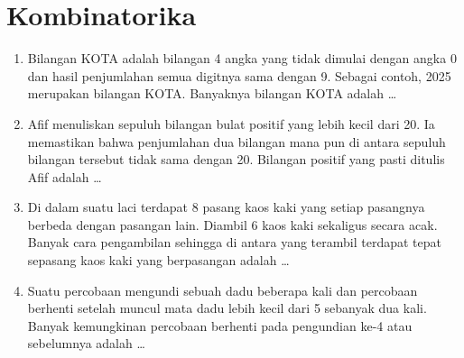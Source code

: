 \documentclass[12pt]{scrartcl}
\begin{document}
\section{Kombinatorika}
\begin{enumerate}[resume]
	\item Bilangan KOTA adalah bilangan 4 angka yang tidak dimulai dengan angka 0 dan hasil
	penjumlahan semua digitnya sama dengan 9. Sebagai contoh, 2025 merupakan bilangan KOTA.
	Banyaknya bilangan KOTA adalah \dots

	\item Afif menuliskan sepuluh bilangan bulat positif yang lebih kecil dari 20.
	Ia memastikan bahwa penjumlahan dua bilangan mana pun di antara sepuluh bilangan tersebut
	tidak sama dengan 20. Bilangan positif yang pasti ditulis Afif adalah \dots

	\item Di dalam suatu laci terdapat 8 pasang kaos kaki yang setiap pasangnya berbeda dengan
	pasangan lain. Diambil 6 kaos kaki sekaligus secara acak. Banyak cara pengambilan sehingga
	di antara yang terambil terdapat tepat sepasang kaos kaki yang berpasangan adalah \dots

	\item Suatu percobaan mengundi sebuah dadu beberapa kali dan percobaan berhenti setelah muncul
	mata dadu lebih kecil dari 5 sebanyak dua kali. Banyak kemungkinan percobaan berhenti pada
	pengundian ke-4 atau sebelumnya adalah \dots
\end{enumerate}
\end{document}
